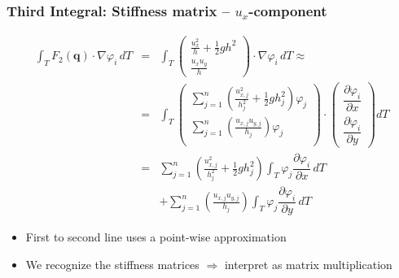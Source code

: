 \documentclass{beamer}
\newcommand{\pd}[2]{\dfrac{\partial #1}{\partial #2}}
\renewcommand{\phi}{\varphi}
\begin{document}
\begin{frame}
  \frametitle{Third Integral: Stiffness matrix -- $u_x$-component}
  \begin{eqnarray*}
    \label{sec:third-integral-second-line-1}
    \int_T F_2(\mathbf{q}) \cdot \nabla \phi_i \, dT &=&
    \int_T
    \begin{pmatrix}
      \frac{u_x^2}{h} + \frac{1}{2} g h^2 \\ \frac{u_x u_y}{h}
    \end{pmatrix}
    \cdot \nabla \phi_i \, dT \approx \\        
    \label{sec:third-integral-second-line-2}
    &=& 
    \int_T 
    \begin{pmatrix}
      \sum_{j=1}^n \left(\frac{u_{x,j}^2}{h_j^2} + \frac{1}{2} g h_j^2\right) \phi_j \\
      \sum_{j=1}^n \left(\frac{u_{x,j} u_{y,j}}{h_j}\right) \phi_j \\
    \end{pmatrix}
    \cdot 
    \begin{pmatrix}
      \pd{\phi_i}{x} \\
      \pd{\phi_i}{y} 
    \end{pmatrix} dT \\
    &=& \nonumber \sum_{j=1}^n \left(\frac{u_{x,j}^2}{h_j^2} + \frac{1}{2} g h_j^2\right) \int_T \phi_j \pd{\phi_i}{x} \, dT \\ 
    &&+ \nonumber \sum_{j=1}^n \left(\frac{u_{x,j} u_{y,j}}{h_j}\right) \int_T \phi_j \pd{\phi_i}{y} \, dT
  \end{eqnarray*}
    \begin{itemize}
    \item First to second line uses a point-wise approximation
    \item We recognize the stiffness matrices $\Rightarrow$ interpret as matrix multiplication
    \end{itemize}
\end{frame}
\end{document}
